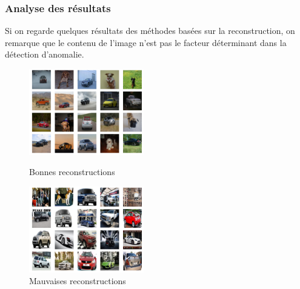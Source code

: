 \documentclass{beamer}
\begin{document}
	\begin{frame}
		\frametitle{Analyse des résultats}
		
		Si on regarde quelques résultats des méthodes basées sur la reconstruction, on remarque que le contenu de l'image n'est pas le facteur déterminant dans la détection d'anomalie.
		
		\vspace{0.5cm}
		
		\begin{figure}
			\centering
			\begin{minipage}{.45\textwidth}
				\includegraphics[width=5cm]{../rapports/images/smallest_errors}
				\caption{Bonnes reconstructions}
			\end{minipage}\hfill
			\begin{minipage}{.45\textwidth}
				\includegraphics[width=5cm]{../rapports/images/biggest_errors}
				\caption{Mauvaises reconstructions}
			\end{minipage}
		\end{figure}
		
		
	\end{frame}
\end{document}
